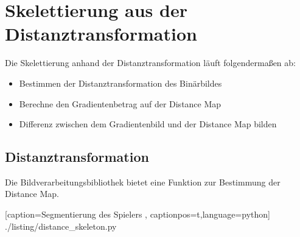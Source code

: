 \section{Skelettierung aus der Distanztransformation}
Die Skelettierung anhand der Distanztransformation läuft folgendermaßen ab:
\begin{itemize}
\item Bestimmen der Distanztransformation des Binärbildes
\item Berechne den Gradientenbetrag auf der Distance Map
\item Differenz zwischen dem Gradientenbild und der Distance Map bilden
\end{itemize}
\subsection{Distanztransformation}
Die Bildverarbeitungsbibliothek bietet eine Funktion zur Bestimmung der Distance Map.

    [caption={Segmentierung des Spielers}
       \label{lst:player_segmentation},
       captionpos=t,language=python]
 {./listing/distance_skeleton.py} 